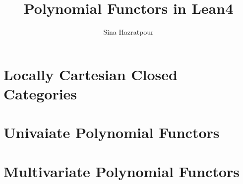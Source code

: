 
\title{Polynomial Functors in Lean4}
\author{Sina Hazratpour}


\maketitle

\chapter{Locally Cartesian Closed Categories}

\chapter{Univaiate Polynomial Functors}

\chapter{Multivariate Polynomial Functors}


% 


